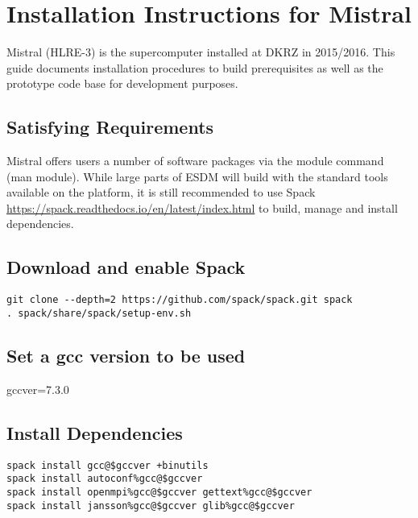 \section{Installation Instructions for Mistral}%
\label{installation-instructions-for-mistral}

Mistral (HLRE-3) is the supercomputer installed at DKRZ in 2015/2016.
This guide documents installation procedures to build prerequisites as well as the prototype code base for development purposes.

\subsection{Satisfying Requirements}%
\label{satisfying-requirements}

Mistral offers users a number of software packages via the module command (man module). 
While large parts of ESDM will build with the standard tools available on the platform, it is still recommended to use Spack \url{https://spack.readthedocs.io/en/latest/index.html} to build, manage and install dependencies.

\subsection{Download and enable Spack}%
\label{download-and-enable-spack}

\begin{lstlisting}
git clone --depth=2 https://github.com/spack/spack.git spack
. spack/share/spack/setup-env.sh
\end{lstlisting}

\subsection{Set a gcc version to be used}%
\label{set-a-gcc-version-to-be-used}

gccver=7.3.0

\subsection{Install Dependencies}%
\label{install-dependencies}

\begin{lstlisting}
spack install gcc@$gccver +binutils
spack install autoconf%gcc@$gccver
spack install openmpi%gcc@$gccver gettext%gcc@$gccver
spack install jansson%gcc@$gccver glib%gcc@$gccver
\end{lstlisting}

